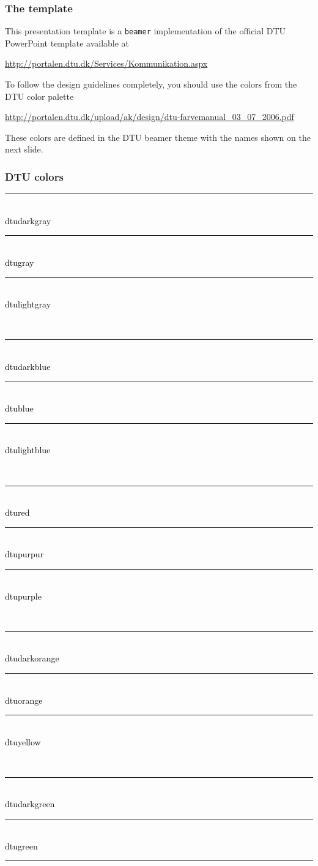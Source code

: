 \documentclass[presentation]{beamer}   %
\begin{document}
\begin{frame}
  \frametitle{The template}
  This presentation template is a \texttt{beamer} implementation of the official DTU PowerPoint template available at
  \begin{center}
    \url{http://portalen.dtu.dk/Services/Kommunikation.aspx}
  \end{center}
  
  To follow the design guidelines completely, you should use the colors from the DTU color palette
  \begin{center}
    \url{http://portalen.dtu.dk/upload/ak/design/dtu-farvemanual_03_07_2006.pdf}
  \end{center}
  These colors are defined in the DTU beamer theme with the names shown on the next slide.
\end{frame}
  
  \newcommand\dtucolorbox[1]{\parbox[b][1cm+2ex][c]{2cm}{\tiny \centering\color{#1}\rule{.8cm}{.8cm}\\ \textcolor{black}{#1}}}%
\begin{frame}
  \frametitle{DTU colors}
  \centering
  \dtucolorbox{dtudarkgray}\dtucolorbox{dtugray}\dtucolorbox{dtulightgray}\\
  \dtucolorbox{dtudarkblue}\dtucolorbox{dtublue}\dtucolorbox{dtulightblue}\\
  \dtucolorbox{dtured}\dtucolorbox{dtupurpur}\dtucolorbox{dtupurple}\\
  \dtucolorbox{dtudarkorange}\dtucolorbox{dtuorange}\dtucolorbox{dtuyellow}\\
  \dtucolorbox{dtudarkgreen}\dtucolorbox{dtugreen}\rule{2cm}{0pt}\\
\end{frame}
\end{document}
